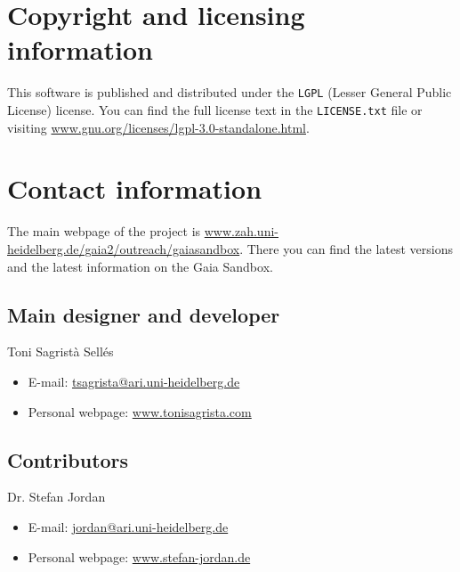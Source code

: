 \documentclass[
a4paper, %
11pt, %
onecolumn, %
openany, %
]{memoir}
\begin{document}
\chapter{Copyright and licensing information}
This software is published and distributed under the \texttt{LGPL}
(Lesser General Public License) license. You can find the full license
text in the \texttt{LICENSE.txt} file or visiting 
\href{https://www.gnu.org/licenses/lgpl-3.0-standalone.html}{www.gnu.org/licenses/lgpl-3.0-standalone.html}.

\chapter{Contact information}
The main webpage of the project is \href{http://www.zah.uni-heidelberg.de/gaia2/outreach/gaiasandbox}{www.zah.uni-heidelberg.de/gaia2/outreach/gaiasandbox}.
There you can find the latest versions and the latest information on the Gaia Sandbox.
\section{Main designer and developer}
Toni Sagrist\`a Sell\'es
\begin{itemize}
\item E-mail: \href{mailto:tsagrista@ari.uni-heidelberg.de}{tsagrista@ari.uni-heidelberg.de}
\item Personal webpage: \href{http://www.tonisagrista.com}{www.tonisagrista.com}
\end{itemize}

\section{Contributors}
Dr. Stefan Jordan
\begin{itemize}
\item E-mail: \href{mailto:jordan@ari.uni-heidelberg.de}{jordan@ari.uni-heidelberg.de}
\item Personal webpage: \href{http://www.stefan-jordan.de}{www.stefan-jordan.de}
\end{itemize}
\end{document}
